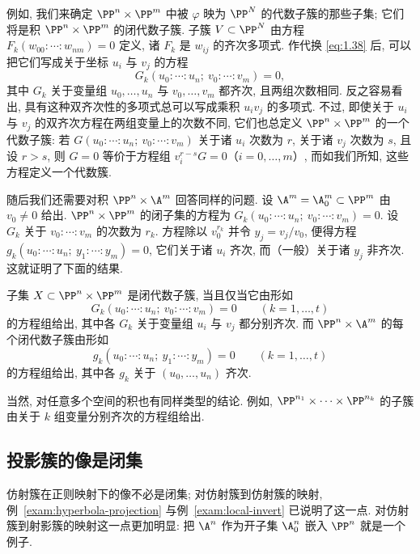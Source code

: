 例如, 我们来确定 $\PP^n \times \PP^m$ 中被 $\varphi$ 映为 $\PP^N$ 的代数子簇的那些子集; 它们将是积 $\PP^n \times \PP^m$ 的闭代数子簇. 子簇 $V \subset \PP^N$ 由方程 $F_k(w_{00} : \cdots : w_{nm}) = 0$ 定义, 诸 $F_k$ 是 $w_{ij}$ 的齐次多项式. 作代换 \eqref{eq:1.38} 后, 可以把它们写成关于坐标 $u_i$ 与 $v_j$ 的方程
\[
	G_k(u_0 : \cdots : u_n;\ v_0 : \cdots : v_m) = 0,
\]
其中 $G_k$ 关于变量组 $u_0, \ldots, u_n$ 与 $v_0, \ldots, v_m$ 都齐次, 且两组次数相同. 反之容易看出, 具有这种双齐次性的多项式总可以写成乘积 $u_i v_j$ 的多项式. 不过, 即使关于 $u_i$ 与 $v_j$ 的双齐次方程在两组变量上的次数不同, 它们也总定义 $\PP^n \times \PP^m$ 的一个代数子簇: 若 $G(u_0 : \cdots : u_n;\ v_0 : \cdots : v_m)$ 关于诸 $u_i$ 次数为 $r$, 关于诸 $v_j$ 次数为 $s$, 且设 $r > s$, 则 $G = 0$ 等价于方程组 $v_i^{r-s} G = 0$（$i = 0, \ldots, m$）, 而如我们所知, 这些方程定义一个代数簇.

随后我们还需要对积 $\PP^n \times \A^m$ 回答同样的问题. 设 $\A^m = \A^m_0 \subset \PP^m$ 由 $v_0 \ne 0$ 给出. $\PP^n \times \PP^m$ 的闭子集的方程为 $G_k(u_0 : \cdots : u_n;\ v_0 : \cdots : v_m) = 0$. 设 $G_k$ 关于 $v_0 : \cdots : v_m$ 的次数为 $r_k$. 方程除以 $v_0^{r_k}$ 并令 $y_j = v_j/v_0$, 便得方程 $g_k(u_0 : \cdots : u_n;\ y_1 : \cdots : y_m) = 0$, 它们关于诸 $u_i$ 齐次, 而（一般）关于诸 $y_j$ 非齐次. 这就证明了下面的结果.

\begin{theorem}\label{thm:product-closed}
	子集 $X \subset \PP^n \times \PP^m$ 是闭代数子簇, 当且仅当它由形如
	\[
		G_k(u_0 : \cdots : u_n;\ v_0 : \cdots : v_m) = 0 \qquad (k = 1, \ldots, t)
	\]
	的方程组给出, 其中各 $G_k$ 关于变量组 $u_i$ 与 $v_j$ 都分别齐次. 而 $\PP^n \times \A^m$ 的每个闭代数子簇由形如
	\begin{equation}
		\label{eq:1.40}
		g_k(u_0 : \cdots : u_n;\ y_1 : \cdots : y_m) = 0 \qquad (k = 1, \ldots, t)
	\end{equation}
	的方程组给出, 其中各 $g_k$ 关于 $(u_0, \ldots, u_n)$ 齐次.
\end{theorem}

当然, 对任意多个空间的积也有同样类型的结论. 例如, $\PP^{n_1} \times \cdots \times \PP^{n_k}$ 的子簇由关于 $k$ 组变量分别齐次的方程组给出.

\subsection{投影簇的像是闭集}

仿射簇在正则映射下的像不必是闭集; 对仿射簇到仿射簇的映射, 例~\ref{exam:hyperbola-projection} 与例~\ref{exam:local-invert} 已说明了这一点. 对仿射簇到射影簇的映射这一点更加明显: 把 $\A^n$ 作为开子集 $\A^n_0$ 嵌入 $\PP^n$ 就是一个例子.

